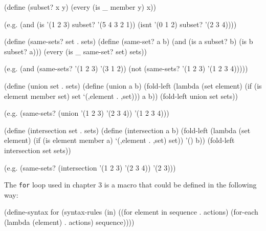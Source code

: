 \begin{Snippet}
  (define (subset? x y)
    (every (is _ member y) x))
\end{Snippet}

\begin{Snippet}
  (e.g. (and (is '(1 2 3) subset? '(5 4 3 2 1))
             (isnt '(0 1 2) subset? '(2 3 4))))
\end{Snippet}

\begin{Snippet}
  (define (same-sets? set . sets)
    (define (same-set? a b)
      (and (is a subset? b)
           (is b subset? a)))
    (every (is _ same-set? set) sets))
\end{Snippet}

\begin{Snippet}
  (e.g. (and (same-sets? '(1 2 3) '(3 1 2))
             (not (same-sets? '(1 2 3) '(1 2 3 4)))))
\end{Snippet}

\begin{Snippet}
  (define (union set . sets)
    (define (union a b)
      (fold-left (lambda (set element)
		   (if (is element member set)
		       set
		       `(,element . ,set)))
	         a
	         b))
  (fold-left union set sets))
\end{Snippet}

\begin{Snippet}
(e.g. (same-sets? (union '(1 2 3) '(2 3 4)) '(1 2 3 4)))
\end{Snippet}

\begin{Snippet}
  (define (intersection set . sets)
    (define (intersection a b)
      (fold-left (lambda (set element)
		   (if (is element member a)
		       `(,element . ,set)
		       set))
	         '()
	         b))
    (fold-left intersection set sets))
\end{Snippet}

\begin{Snippet}
  (e.g. (same-sets? (intersection '(1 2 3) '(2 3 4)) '(2 3)))
\end{Snippet}

The \texttt{for} loop used in chapter 3 is a macro that could
be defined in the following way:

\begin{Snippet}
  (define-syntax for
    (syntax-rules (in)
      ((for element in sequence . actions)
       (for-each (lambda (element) . actions)
                 sequence))))
\end{Snippet}

